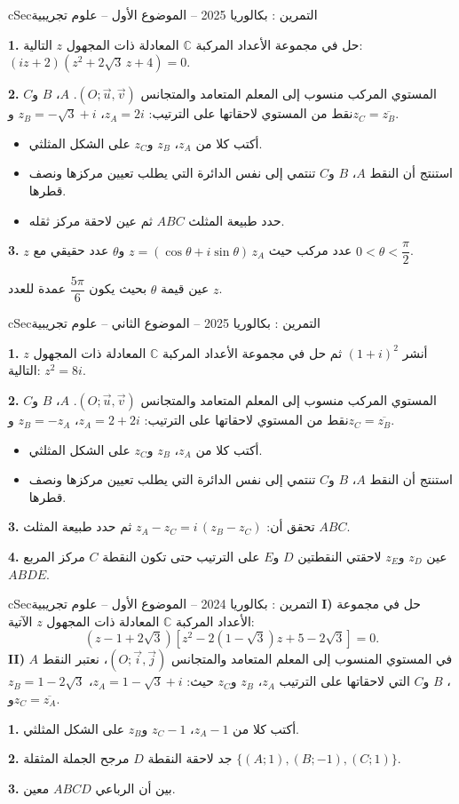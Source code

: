 \documentclass[12pt,a4paper]{article}
\newenvironment{BOX}[2]{\begin{otherlanguage}{english}\begin{arbox}{#1}{#2}}{\end{arbox}\end{otherlanguage}}
\newcounter{exo}
\newenvironment{tamrin}[1]{\stepcounter{exo}\begin{BOX}{cSec}{التمرين \theexo: #1}}{\end{BOX}}
\newenvironment{sq}{\begin{itemize}[leftmargin=2.4em,itemsep=3pt]}{\end{itemize}}
\newcommand{\qa}{\item[(أ)]}\newcommand{\qb}{\item[(ب)]}\newcommand{\qc}{\item[(جـ)]}\newcommand{\qd}{\item[(د)]}\newcommand{\qe}{\item[(هـ)]}
\newcommand{\QQ}[1]{\par\smallskip\textbf{#1.} }
\begin{document}
\begin{tamrin}{بكالوريا 2025 -- الموضوع الأول -- علوم تجريبية}
\QQ{1} حل في مجموعة الأعداد المركبة $\mathbb{C}$ المعادلة ذات المجهول $z$ التالية: $(iz+2)\left(z^2+2\sqrt3\,z+4\right)=0$.
\QQ{2} المستوي المركب منسوب إلى المعلم المتعامد والمتجانس $(O;\vec u,\vec v)$. $A$، $B$ و$C$ نقط من المستوي لاحقاتها على الترتيب: $z_A=2i$، $z_B=-\sqrt3+i$ و$z_C=\overline{z_B}$.
\begin{sq}
\qa أكتب كلا من $z_A$، $z_B$ و$z_C$ على الشكل المثلثي.
\qb استنتج أن النقط $A$، $B$ و$C$ تنتمي إلى نفس الدائرة التي يطلب تعيين مركزها ونصف قطرها.
\qc حدد طبيعة المثلث $ABC$ ثم عين لاحقة مركز ثقله.
\end{sq}
\QQ{3} $z$ عدد مركب حيث $z=(\cos\theta+i\sin\theta)\,z_A$ و$\theta$ عدد حقيقي مع $0<\theta<\dfrac{\pi}{2}$.

عين قيمة $\theta$ بحيث يكون $\dfrac{5\pi}{6}$ عمدة للعدد $z$.
\end{tamrin}

\begin{tamrin}{بكالوريا 2025 -- الموضوع الثاني -- علوم تجريبية}
\QQ{1} أنشر $(1+i)^2$ ثم حل في مجموعة الأعداد المركبة $\mathbb{C}$ المعادلة ذات المجهول $z$ التالية: $z^2=8i$.
\QQ{2} المستوي المركب منسوب إلى المعلم المتعامد والمتجانس $(O;\vec u,\vec v)$. $A$، $B$ و$C$ نقط من المستوي لاحقاتها على الترتيب: $z_A=2+2i$، $z_B=-z_A$ و$z_C=\overline{z_B}$.
\begin{sq}
\qa أكتب كلا من $z_A$، $z_B$ و$z_C$ على الشكل المثلثي.
\qb استنتج أن النقط $A$، $B$ و$C$ تنتمي إلى نفس الدائرة التي يطلب تعيين مركزها ونصف قطرها.
\end{sq}
\QQ{3} تحقق أن: $z_A-z_C=i\,(z_B-z_C)$ ثم حدد طبيعة المثلث $ABC$.
\QQ{4} عين $z_D$ و$z_E$ لاحقتي النقطتين $D$ و$E$ على الترتيب حتى تكون النقطة $C$ مركز المربع $ABDE$.
\end{tamrin}

\begin{tamrin}{بكالوريا 2024 -- الموضوع الأول -- علوم تجريبية}
\textbf{I)} حل في مجموعة الأعداد المركبة $\mathbb{C}$ المعادلة ذات المجهول $z$ الآتية:
\[\left(z-1+2\sqrt3\right)\left[z^2-2\left(1-\sqrt3\right)z+5-2\sqrt3\right]=0 .\]
\textbf{II)} في المستوي المنسوب إلى المعلم المتعامد والمتجانس $(O;\vec i,\vec j)$، نعتبر النقط $A$، $B$ و$C$ التي لاحقاتها على الترتيب $z_A$، $z_B$ و$z_C$ حيث: $z_A=1-\sqrt3+i$، $z_B=1-2\sqrt3$ و$z_C=\overline{z_A}$.
\QQ{1} أكتب كلا من $z_A-1$، $z_C-1$ و$z_B$ على الشكل المثلثي.
\QQ{2} جد لاحقة النقطة $D$ مرجح الجملة المثقلة $\{(A;1),(B;-1),(C;1)\}$.
\QQ{3} بين أن الرباعي $ABCD$ معين.
\end{tamrin}
\end{document}
